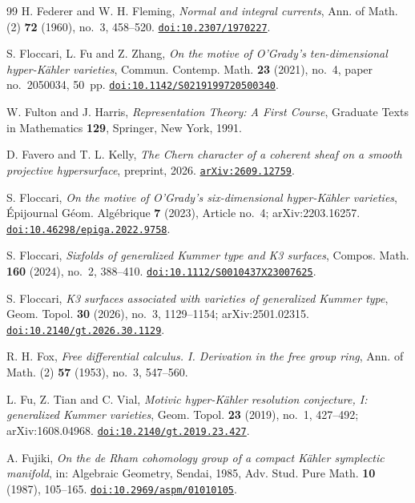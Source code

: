 \begin{thebibliography}{99}
H. Federer and W. H. Fleming,
\emph{Normal and integral currents},
Ann. of Math. (2) \textbf{72} (1960), no.~3, 458--520.
\href{https://doi.org/10.2307/1970227}{\texttt{doi:10.2307/1970227}}.

S. Floccari, L. Fu and Z. Zhang,
\emph{On the motive of O'Grady's ten-dimensional hyper-K\"ahler varieties},
Commun. Contemp. Math. \textbf{23} (2021), no.~4, paper no.~2050034,
50~pp.
\href{https://doi.org/10.1142/S0219199720500340}{\texttt{doi:10.1142/S0219199720500340}}.

W. Fulton and J. Harris,
\emph{Representation Theory: A First Course},
Graduate Texts in Mathematics \textbf{129}, Springer, New York, 1991.

D. Favero and T. L. Kelly,
\emph{The Chern character of a coherent sheaf on a smooth projective
hypersurface},
preprint, 2026.
\href{https://arxiv.org/abs/2609.12759}{\texttt{arXiv:2609.12759}}.

S. Floccari,
\emph{On the motive of O'Grady's six-dimensional hyper-K\"ahler varieties},
\'Epijournal G\'eom. Alg\'ebrique \textbf{7} (2023), Article no.~4;
arXiv:2203.16257.
\href{https://doi.org/10.46298/epiga.2022.9758}{\texttt{doi:10.46298/epiga.2022.9758}}.

S. Floccari,
\emph{Sixfolds of generalized Kummer type and K3 surfaces},
Compos. Math. \textbf{160} (2024), no.~2, 388--410.
\href{https://doi.org/10.1112/S0010437X23007625}{\texttt{doi:10.1112/S0010437X23007625}}.

S. Floccari,
\emph{K3 surfaces associated with varieties of generalized Kummer type},
Geom. Topol. \textbf{30} (2026), no.~3, 1129--1154; arXiv:2501.02315.
\href{https://doi.org/10.2140/gt.2026.30.1129}{\texttt{doi:10.2140/gt.2026.30.1129}}.

R. H. Fox,
\emph{Free differential calculus. I. Derivation in the free group ring},
Ann. of Math. (2) \textbf{57} (1953), no.~3, 547--560.

L. Fu, Z. Tian and C. Vial,
\emph{Motivic hyper-K\"ahler resolution conjecture, I: generalized Kummer
varieties},
Geom. Topol. \textbf{23} (2019), no.~1, 427--492; arXiv:1608.04968.
\href{https://doi.org/10.2140/gt.2019.23.427}{\texttt{doi:10.2140/gt.2019.23.427}}.

A. Fujiki,
\emph{On the de Rham cohomology group of a compact K\"ahler symplectic
manifold},
in: Algebraic Geometry, Sendai, 1985, Adv. Stud. Pure Math. \textbf{10}
(1987), 105--165.
\href{https://doi.org/10.2969/aspm/01010105}{\texttt{doi:10.2969/aspm/01010105}}.


\end{thebibliography}
